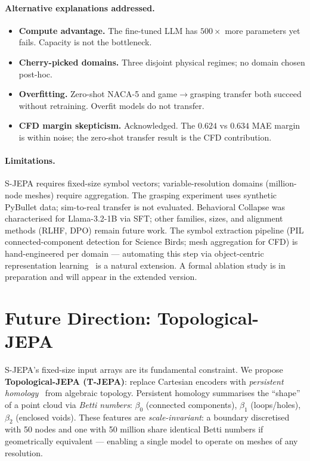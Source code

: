 \documentclass[10pt,twocolumn]{article}
\begin{document}
\paragraph{Alternative explanations addressed.}
\begin{itemize}[leftmargin=*,topsep=2pt,itemsep=1pt]
\item \textbf{Compute advantage.} The fine-tuned LLM has $500\times$ more parameters yet
  fails. Capacity is not the bottleneck.
\item \textbf{Cherry-picked domains.} Three disjoint physical regimes; no domain chosen
  post-hoc.
\item \textbf{Overfitting.} Zero-shot NACA-5 and game$\to$grasping transfer both succeed
  without retraining. Overfit models do not transfer.
\item \textbf{CFD margin skepticism.} Acknowledged. The $0.624$ vs $0.634$ MAE margin is
  within noise; the zero-shot transfer result is the CFD contribution.
\end{itemize}

\paragraph{Limitations.}
S-JEPA requires fixed-size symbol vectors; variable-resolution domains (million-node meshes)
require aggregation. The grasping experiment uses synthetic PyBullet data; sim-to-real
transfer is not evaluated. Behavioral Collapse was characterised for Llama-3.2-1B via
SFT; other families, sizes, and alignment methods (RLHF, DPO) remain future work.
The symbol extraction pipeline (PIL connected-component detection for Science Birds;
mesh aggregation for CFD) is hand-engineered per domain — automating this step via
object-centric representation learning~\citep{kipf2020cswm} is a natural extension.
A formal ablation study is in preparation and will appear in the extended version.

\section{Future Direction: Topological-JEPA}
\label{sec:future}

S-JEPA's fixed-size input arrays are its fundamental constraint. We propose
\textbf{Topological-JEPA (T-JEPA)}: replace Cartesian encoders with
\emph{persistent homology}~\citep{edelsbrunner2010topology} from algebraic topology.
Persistent homology summarises the ``shape'' of a point cloud via \emph{Betti numbers}:
$\beta_0$ (connected components), $\beta_1$ (loops/holes), $\beta_2$ (enclosed voids).
These features are \emph{scale-invariant}: a boundary discretised with 50 nodes and one
with 50 million share identical Betti numbers if geometrically equivalent — enabling
a single model to operate on meshes of any resolution.
\end{document}
